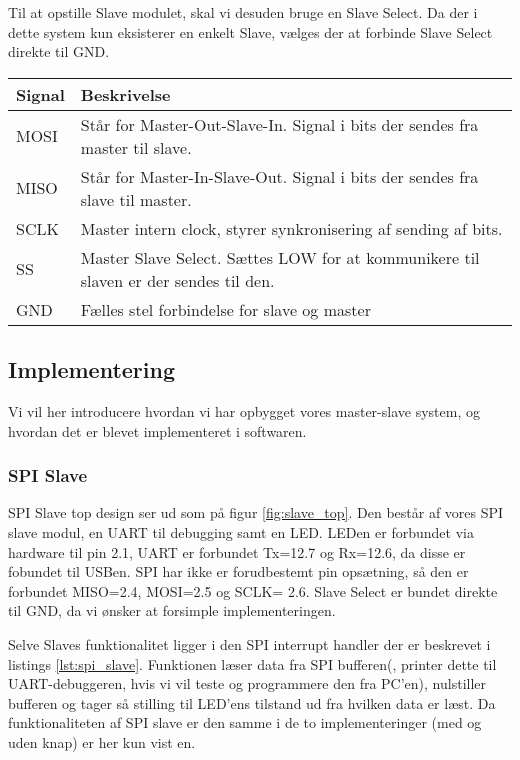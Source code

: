\documentclass[../main.tex]{subfiles}
\begin{document}
Til at opstille Slave modulet, skal vi desuden bruge en Slave Select. Da der i dette system kun eksisterer en enkelt Slave, vælges der at forbinde Slave Select direkte til GND.


\begin{center}
\begin{tabular}{ | m{5em} | m{5cm}| } 
\hline
\textbf{Signal}& \textbf{Beskrivelse}\\ 
\hline
MOSI& Står for Master-Out-Slave-In. Signal i bits der sendes  fra master til slave.\\ 
\hline
MISO& Står for Master-In-Slave-Out. Signal i bits der sendes fra slave til master.\\ 
\hline
SCLK& Master intern clock, styrer synkronisering af sending af bits. \\ 
\hline
SS& Master Slave Select. Sættes LOW for at kommunikere til slaven er der sendes til den.\\
\hline
GND& Fælles stel forbindelse for slave og master\\
\hline
\end{tabular}
\end{center}

\subsection{Implementering}

Vi vil her introducere hvordan vi har opbygget vores master-slave system, og hvordan det er blevet implementeret i softwaren.

\subsubsection{SPI Slave}

SPI Slave top design ser ud som på figur \ref{fig:slave_top}. Den består af vores SPI slave modul, en UART til debugging samt en LED. LEDen er forbundet via hardware til pin 2.1, UART er forbundet Tx=12.7 og Rx=12.6, da disse er fobundet til USBen. SPI har ikke er forudbestemt pin opsætning, så den er forbundet MISO=2.4, MOSI=2.5 og SCLK= 2.6. Slave Select er bundet direkte til GND, da vi ønsker at forsimple implementeringen. 


Selve Slaves funktionalitet ligger i den SPI interrupt handler der er beskrevet i listings \ref{lst:spi_slave}. Funktionen læser data fra SPI bufferen(, printer dette til UART-debuggeren, hvis vi vil teste og programmere den fra PC'en), nulstiller bufferen og tager så stilling til LED'ens tilstand ud fra hvilken data er læst. Da funktionaliteten af SPI slave er den samme i de to implementeringer (med og uden knap) er her kun vist en.
\end{document}

